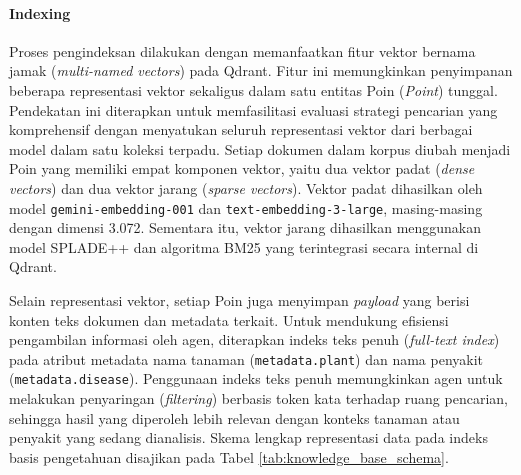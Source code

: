 \paragraph{Indexing}
Proses pengindeksan dilakukan dengan memanfaatkan fitur vektor bernama jamak (\textit{multi-named vectors}) pada Qdrant. Fitur ini memungkinkan penyimpanan beberapa representasi vektor sekaligus dalam satu entitas Poin (\textit{Point}) tunggal. Pendekatan ini diterapkan untuk memfasilitasi evaluasi strategi pencarian yang komprehensif dengan menyatukan seluruh representasi vektor dari berbagai model dalam satu koleksi terpadu. Setiap dokumen dalam korpus diubah menjadi Poin yang memiliki empat komponen vektor, yaitu dua vektor padat (\textit{dense vectors}) dan dua vektor jarang (\textit{sparse vectors}). Vektor padat dihasilkan oleh model \texttt{gemini-embedding-001} dan \texttt{text-embedding-3-large}, masing-masing dengan dimensi 3.072. Sementara itu, vektor jarang dihasilkan menggunakan model SPLADE++ dan algoritma BM25 yang terintegrasi secara internal di Qdrant.

Selain representasi vektor, setiap Poin juga menyimpan \textit{payload} yang berisi konten teks dokumen dan metadata terkait. Untuk mendukung efisiensi pengambilan informasi oleh agen, diterapkan indeks teks penuh (\textit{full-text index}) pada atribut metadata nama tanaman (\texttt{metadata.plant}) dan nama penyakit (\texttt{metadata.disease}). Penggunaan indeks teks penuh memungkinkan agen untuk melakukan penyaringan (\textit{filtering}) berbasis token kata terhadap ruang pencarian, sehingga hasil yang diperoleh lebih relevan dengan konteks tanaman atau penyakit yang sedang dianalisis. Skema lengkap representasi data pada indeks basis pengetahuan disajikan pada Tabel \ref{tab:knowledge_base_schema}.

